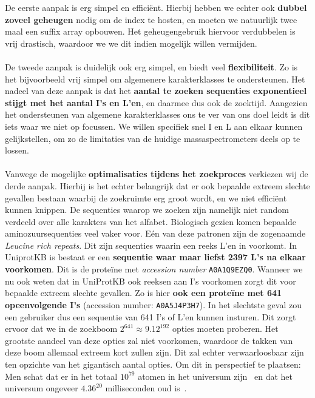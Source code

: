 De eerste aanpak is erg simpel en efficiënt.
Hierbij hebben we echter ook \textbf{dubbel zoveel geheugen} nodig om de index te hosten, en moeten we natuurlijk twee maal een suffix array opbouwen.
Het geheugengebruik hiervoor verdubbelen is vrij drastisch, waardoor we we dit indien mogelijk willen vermijden.
\\ \\
De tweede aanpak is duidelijk ook erg simpel, en biedt veel \textbf{flexibiliteit}.
Zo is het bijvoorbeeld vrij simpel om algemenere karakterklasses te ondersteunen.
Het nadeel van deze aanpak is dat het \textbf{aantal te zoeken sequenties exponentieel stijgt met het aantal I's en L'en}, en daarmee dus ook de zoektijd.
Aangezien het ondersteunen van algemene karakterklasses ons te ver van ons doel leidt is dit iets waar we niet op focussen.
We willen specifiek snel I en L aan elkaar kunnen gelijkstellen, om zo de limitaties van de huidige massaspectrometers deels op te lossen.
\\ \\
Vanwege de mogelijke \textbf{optimalisaties tijdens het zoekproces} verkiezen wij de derde aanpak.
Hierbij is het echter belangrijk dat er ook bepaalde extreem slechte gevallen bestaan waarbij de zoekruimte erg groot wordt, en we niet efficiënt kunnen knippen.
De sequenties waarop we zoeken zijn namelijk niet random verdeeld over alle karakters van het alfabet.
Biologisch gezien komen bepaalde aminozuursequenties veel vaker voor.
Eén van deze patronen zijn de zogenaamde \textit{Leucine rich repeats}\cite{leucine_rich_repeats}.
Dit zijn sequenties waarin een reeks L'en in voorkomt.
In UniprotKB is bestaat er een \textbf{sequentie waar maar liefst 2397 L's na elkaar voorkomen}.
Dit is de proteïne met \textit{accession number} \texttt{A0A1Q9EZQ0}.
Wanneer we nu ook weten dat in UniProtKB ook reeksen aan I's voorkomen zorgt dit voor bepaalde extreem slechte gevallen.
Zo is hier \textbf{ook een proteïne met 641 opeenvolgende I's} (accession number: \texttt{A0A5J4P3H7}).
In het slechtste geval zou een gebruiker dus een sequentie van 641 I's of L'en kunnen insturen.
Dit zorgt ervoor dat we in de zoekboom $2^{641} \approx 9.12^{192}$ opties moeten proberen.
Het grootste aandeel van deze opties zal niet voorkomen, waardoor de takken van deze boom allemaal extreem kort zullen zijn.
Dit zal echter verwaarloosbaar zijn ten opzichte van het gigantisch aantal opties.
Om dit in perspectief te plaatsen: Men schat dat er in het totaal $10^{79}$ atomen in het universum zijn~\cite{atoms_in_universe} en dat het universum ongeveer $4.36^{20}$ milliseconden oud is~\cite{age_universe}.
